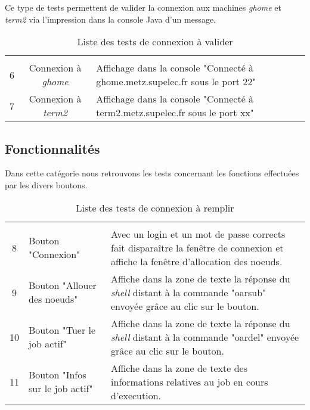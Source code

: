 \par Ce type de tests permettent de valider la connexion aux machines \emph{ghome} et \emph{term2} via l'impression dans la console Java d'un message.

\begin{table}[h!]
  \centering
  \begin{tabular}[h!]{|c|c|p{10cm}|}
\hline \\
    6 & Connexion à \emph{ghome} & Affichage dans la console "Connecté à ghome.metz.supelec.fr sous le port 22"\\
    7 & Connexion à \emph{term2} & Affichage dans la console "Connecté à term2.metz.supelec.fr sous le port xx"\\
\hline
  \end{tabular}
  \caption{Liste des tests de connexion à valider}
  \label{tab:tests_connexion}
\end{table}

\subsection{Fonctionnalités}
\label{sec:fonctions}

\par Dans cette catégorie nous retrouvons les tests concernant les fonctions effectuées par les divers boutons.

\begin{table}[h!]
  \centering
  \begin{tabular}[h!]{|c|p{3cm}|p{10cm}|}
\hline \\
    8 & Bouton "Connexion" & Avec un login et un mot de passe corrects fait disparaître la fenêtre de connexion et affiche la fenêtre d'allocation des noeuds.\\
    9 & Bouton "Allouer des noeuds" & Affiche dans la zone de texte la réponse du \emph{shell} distant à la commande "oarsub" envoyée grâce au clic sur le bouton.\\
    10 & Bouton "Tuer le job actif" & Affiche dans la zone de texte la réponse du \emph{shell} distant à la commande "oardel" envoyée grâce au clic sur le bouton.\\
    11 & Bouton "Infos sur le job actif" & Affiche dans la zone de texte des informations relatives au job en cours d'execution.\\
\hline
  \end{tabular}
  \caption{Liste des tests de connexion à remplir}
  \label{tab:tests_connexion}
\end{table}

